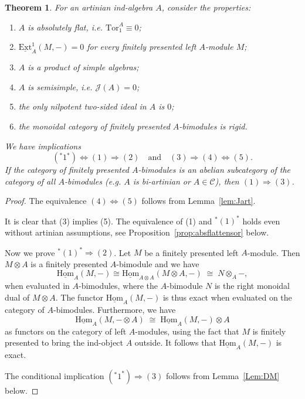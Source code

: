 \documentclass[11pt]{amsart}
\newcommand{\uHom}{\underline{\mathrm{Hom}}}
\def\JJ{\mathcal{J}}
\def\cC{\mathscr{C}}
\def\Ext{\mathrm{Ext}}
\def\Tor{\mathrm{Tor}}
\newtheorem{thm}{Theorem}[section]
\theoremstyle{definition}
\theoremstyle{remark}
\numberwithin{equation}{section}
\newcommand{\uExt}{\underline{\Ext}}
\begin{document}
\begin{thm}\label{prop:consolidate}
    For an artinian ind-algebra $A$, consider the properties:
    \begin{enumerate}
    \item $A$ is absolutely flat, i.e. $\Tor_1^A\equiv0$;
    \item $\uExt^1_A(M,-)=0$ for every finitely presented left $A$-module $M$;
    \item $A$ is a product of simple algebras; 
        \item $A$ is semisimple, i.e. $\JJ(A)=0$;
        \item the only nilpotent two-sided ideal in $A$ is $0$;
        
        
        
         \item[(*1*)] the monoidal category of finitely presented $A$-bimodules is rigid.
        
        \end{enumerate}
        We have implications 
        $$({}^*1{}^*)\Leftrightarrow (1)\Rightarrow (2)\quad\mbox{and}\quad (3)\Rightarrow (4)\Leftrightarrow (5).$$
        If the category of finitely presented $A$-bimodules is an abelian subcategory of the category of all $A$-bimodules (e.g. $A$ is bi-artinian or $A\in\cC$), then $(1)\Rightarrow (3)$. %
\end{thm}
\begin{proof}
 The equivalence $(4)\Leftrightarrow (5)$ follows from Lemma~\ref{lem:Jart}.
    

    It is clear that (3) implies (5). The equivalence of (1) and $^{\ast}(1)^*$ holds even without artinian assumptions, see Proposition~\ref{prop:absflattensor} below.

    Now we prove ${}^\ast(1)^\ast\Rightarrow (2)$. Let $M$ be a finitely presented left $A$-module. Then $M\otimes A$ is a finitely presented $A$-bimodule and we have 
    $$\uHom_A(M,-)\cong\uHom_{A\otimes A}(M\otimes A,-)\;\cong\; N\otimes_A-,$$
when evaluated in $A$-bimodules, where the $A$-bimodule $N$ is the right monoidal dual of $M\otimes A$. The functor $\uHom_A(M,-)$ is thus exact when evaluated on the category of $A$-bimodules. Furthermore, we have
$$\uHom_{A}(M,-\otimes A)\;\cong\; \uHom_A(M,-)\otimes A$$
as functors on the category of left $A$-modules, using the fact that $M$ is finitely presented to bring the ind-object $A$ outside. It follows that $\uHom_{A}(M,-)$ is exact.

    The conditional implication $({}^\ast1^\ast)\Rightarrow (3)$ follows from Lemma~\ref{Lem:DM} below.
\end{proof}
\end{document}
